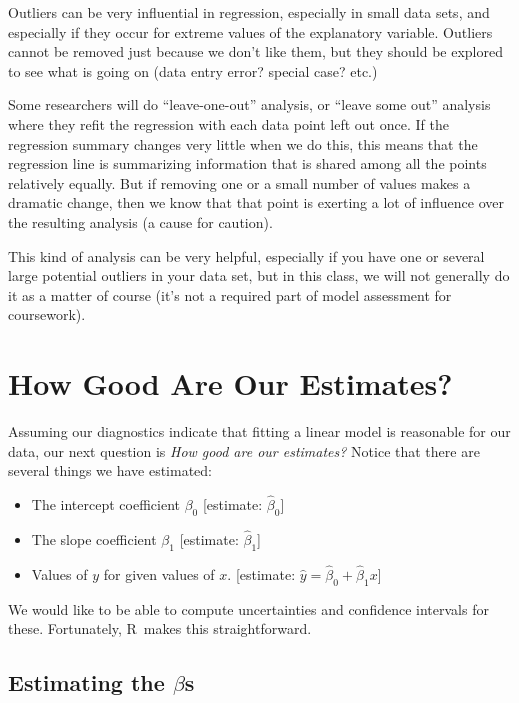 \documentclass[twoside]{book}\usepackage[]{graphicx}\usepackage[]{xcolor}
\def\R{{\sf R}}
\begin{document}
Outliers can be very influential in regression, especially in small data sets,
and especially if they occur for extreme values of the explanatory variable.
Outliers cannot be removed just because we don't like them, but they should be
explored to see what is going on (data entry error? special case? etc.)

Some researchers will do ``leave-one-out'' analysis, or ``leave some out'' analysis
where they refit the regression with each data point left out once.  If the regression summary changes very little when we do this, this means that the regression line
is summarizing information that is shared among all the points relatively equally.
But if removing one or a small number of values makes a dramatic change, then
we know that that point is exerting a lot of influence over the resulting
analysis (a cause for caution).   

This kind of analysis can be very helpful, especially if you have one or several large potential outliers in your data set, but in this class, we will not generally do it as a matter of course (it's not a required part of model assessment for coursework).

\section{How Good Are Our Estimates?}
Assuming our diagnostics indicate that fitting a linear model is reasonable for our data,
our next question is \emph{How good are our estimates?}
Notice that there are several things we have estimated:
\begin{itemize}
	\item The intercept coefficient $\beta_0$ 
		[estimate: $\hat \beta_0$]
	\item The slope coefficient $\beta_1$ 
		[estimate: $\hat \beta_1$]
	\item Values of $y$ for given values of $x$. 
		[estimate: $\hat y = \hat \beta_0 + \hat \beta_1 x$]
\end{itemize}

We would like to be able to compute uncertainties and confidence intervals for these.
Fortunately, \R\ makes this straightforward.

\subsection{Estimating the $\beta$s}
\end{document}
